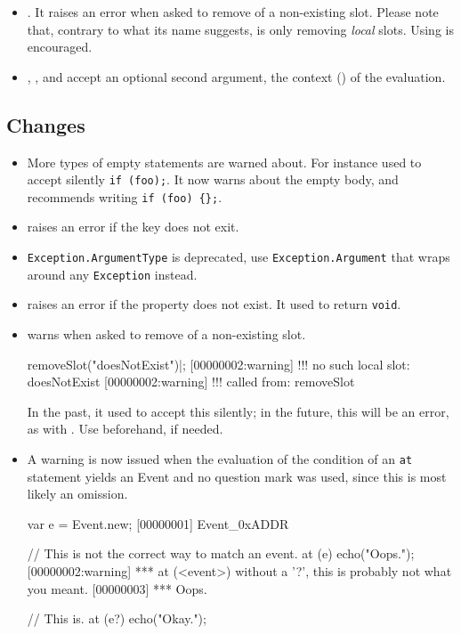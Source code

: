 \begin{itemize}
\item {}.  It raises an error when asked to
  remove of a non-existing slot.  Please note that, contrary to what its
  name suggests,  is only removing \emph{local}
  slots.  Using  is encouraged.

\item {}, , and
   accept an optional second argument, the
  context (\this) of the evaluation.
\end{itemize}

\subsection{Changes}
\begin{itemize}
\item More types of empty statements are warned about.  For instance \urbi
  used to accept silently \lstinline|if (foo);|.  It now warns about the empty
  body, and recommends writing \lstinline|if (foo) {};|.

\item {} raises an error if the key does not exit.

\item \lstinline|Exception.ArgumentType| is deprecated, use
  \lstinline|Exception.Argument| that wraps around any \lstinline|Exception|
  instead.

\item {} raises an error if the property does not
  exist.  It used to return \lstinline|void|.

\item {} warns when asked to remove of a
  non-existing slot.
\begin{urbiscript}
removeSlot("doesNotExist")|;
[00000002:warning] !!! no such local slot: doesNotExist
[00000002:warning] !!!    called from: removeSlot
\end{urbiscript}
  In the past, it used to accept this silently; in the future, this will be
  an error, as with .  Use
   beforehand, if needed.

\item A warning is now issued when the evaluation of the condition of an
  \lstinline|at| statement yields an Event and no question mark was used,
  since this is most likely an omission.

\begin{urbiunchecked}
var e = Event.new;
[00000001] Event_0xADDR

// This is not the correct way to match an event.
at (e) echo("Oops.");
[00000002:warning] *** at (<event>) without a '?', this is probably not what you meant.
[00000003] *** Oops.

// This is.
at (e?) echo("Okay.");
\end{urbiunchecked}
\end{itemize}


